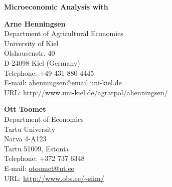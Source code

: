 \documentclass[12pt,english]{article}
\begin{document}
\begin{center}
\textbf{\LARGE
Microeconomic Analysis with 
}
\vspace{3em}\\
\parbox[t]{0.49 \textwidth}{\centering
\textbf{Arne Henningsen}\\
Department of Agricultural Economics\\
University of Kiel\\
Olshausenstr. 40\\
D-24098 Kiel (Germany)\\
Telephone: +49-431-880 4445\\
E-mail: \url{ahenningsen@email.uni-kiel.de}\\
URL: \url{http://www.uni-kiel.de/agrarpol/ahenningsen/}
}
\parbox[t]{0.49 \textwidth}{\centering
\textbf{Ott Toomet}\\
Department of Economics\\
Tartu University\\
Narva 4-A123\\
Tartu 51009, Estonia\\
Telephone: +372 737 6348\\
E-mail: \url{otoomet@ut.ee}\\
URL: \url{http://www.obs.ee/~siim/}
}
\vspace{3em}\\
\end{center}











%

\end{document}
